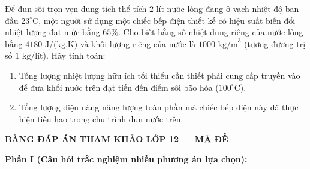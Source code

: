 \begin{ex}%
	Để đun sôi trọn vẹn dung tích thể tích $2\text{ lít}$ nước lỏng đang ở vạch nhiệt độ ban đầu $23^\circ\text{C}$, một người sử dụng một chiếc bếp điện thiết kế có hiệu suất biến đổi nhiệt lượng đạt mức bằng $65\%$. Cho biết hằng số nhiệt dung riêng của nước lỏng bằng $4180\text{ J/(kg.K)}$ và khối lượng riêng của nước là $1000\text{ kg/m}^3$ (tương đương trị số $1\text{ kg/lít}$). Hãy tính toán:
	\begin{enumerate}
		\item[a)] Tổng lượng nhiệt lượng hữu ích tối thiểu cần thiết phải cung cấp truyền vào để đưa khối nước trên đạt tiến đến điểm sôi bão hòa ($100^\circ\text{C}$).
		\item[b)] Tổng lượng điện năng năng lượng toàn phần mà chiếc bếp điện này đã thực hiện tiêu hao trong chu trình đun nước trên.
	\end{enumerate}
\end{ex}


\newpage
\begin{center} \textbf{BẢNG ĐÁP ÁN THAM KHẢO LỚP 12 --- MÃ ĐỀ \thedeso} \end{center}

\noindent \textbf{Phần I (Câu hỏi trắc nghiệm nhiều phương án lựa chọn):}